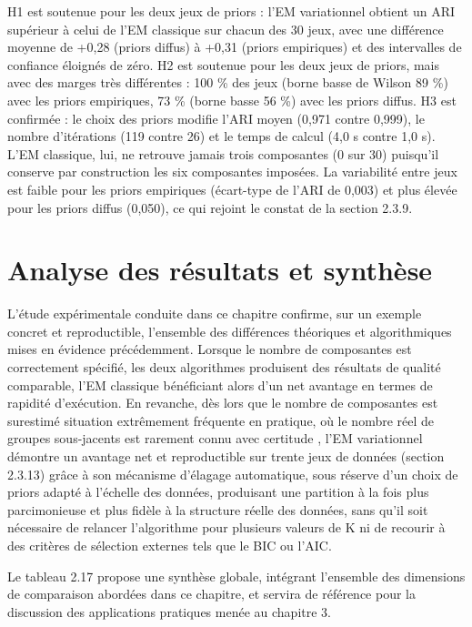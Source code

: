 H1 est soutenue pour les deux jeux de priors : l'EM variationnel obtient un ARI supérieur à celui de l'EM classique sur chacun des 30 jeux, avec une différence moyenne de +0,28 (priors diffus) à +0,31 (priors empiriques) et des intervalles de confiance éloignés de zéro. H2 est soutenue pour les deux jeux de priors, mais avec des marges très différentes : 100 \% des jeux (borne basse de Wilson 89 \%) avec les priors empiriques, 73 \% (borne basse 56 \%) avec les priors diffus. H3 est confirmée : le choix des priors modifie l'ARI moyen (0,971 contre 0,999), le nombre d'itérations (119 contre 26) et le temps de calcul (4,0 s contre 1,0 s). L'EM classique, lui, ne retrouve jamais trois composantes (0 sur 30) puisqu'il conserve par construction les six composantes imposées. La variabilité entre jeux est faible pour les priors empiriques (écart-type de l'ARI de 0,003) et plus élevée pour les priors diffus (0,050), ce qui rejoint le constat de la section 2.3.9.

\section{Analyse des résultats et synthèse}
L'étude expérimentale conduite dans ce chapitre confirme, sur un exemple concret et reproductible, l'ensemble des différences théoriques et algorithmiques mises en évidence précédemment. Lorsque le nombre de composantes est correctement spécifié, les deux algorithmes produisent des résultats de qualité comparable, l'EM classique bénéficiant alors d'un net avantage en termes de rapidité d'exécution. En revanche, dès lors que le nombre de composantes est surestimé  situation extrêmement fréquente en pratique, où le nombre réel de groupes sous-jacents est rarement connu avec certitude , l'EM variationnel démontre un avantage net et reproductible sur trente jeux de données (section 2.3.13) grâce à son mécanisme d'élagage automatique, sous réserve d'un choix de priors adapté à l'échelle des données, produisant une partition à la fois plus parcimonieuse et plus fidèle à la structure réelle des données, sans qu'il soit nécessaire de relancer l'algorithme pour plusieurs valeurs de K ni de recourir à des critères de sélection externes tels que le BIC ou l'AIC.

Le tableau 2.17 propose une synthèse globale, intégrant l'ensemble des dimensions de comparaison abordées dans ce chapitre, et servira de référence pour la discussion des applications pratiques menée au chapitre 3.

